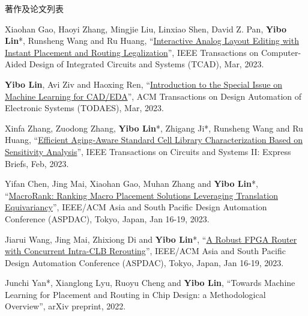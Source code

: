 \begin{rSection}{著作及论文列表}
\begin{description}[font=\normalfont, rightmargin=2em]
\item[{[J111]}]{
        Xiaohan Gao, Haoyi Zhang, Mingjie Liu, Linxiao Shen, David Z. Pan, \textbf{Yibo Lin}*, Runsheng Wang and Ru Huang, 
    ``\href{https://doi.org/10.1109/TCAD.2022.3190234}{Interactive Analog Layout Editing with Instant Placement and Routing Legalization}'', 
    IEEE Transactions on Computer-Aided Design of Integrated Circuits and Systems (TCAD), Mar, 2023.
    
}
            

\item[{[J110]}]{
        \textbf{Yibo Lin}, Avi Ziv and Haoxing Ren, 
    ``\href{https://doi.org/10.1145/3586208}{Introduction to the Special Issue on Machine Learning for CAD/EDA}'', 
    ACM Transactions on Design Automation of Electronic Systems (TODAES), Mar, 2023.
    
}
            

\item[{[J109]}]{
        Xinfa Zhang, Zuodong Zhang, \textbf{Yibo Lin}*, Zhigang Ji*, Runsheng Wang and Ru Huang, 
    ``\href{https://doi.org/10.1109/TCSII.2022.3212123}{Efficient Aging-Aware Standard Cell Library Characterization Based on Sensitivity Analysis}'', 
    IEEE Transactions on Circuits and Systems II: Express Briefs, Feb, 2023.
    
}
            

\item[{[C108]}]{
        Yifan Chen, Jing Mai, Xiaohan Gao, Muhan Zhang and \textbf{Yibo Lin}*, 
    ``\href{https://doi.org/10.1145/3566097.3567899}{MacroRank: Ranking Macro Placement Solutions Leveraging Translation Equivariancy}'', 
    IEEE/ACM Asia and South Pacific Design Automation Conference (ASPDAC), Tokyo, Japan, Jan 16-19, 2023.
    
}
            

\item[{[C107]}]{
        Jiarui Wang, Jing Mai, Zhixiong Di and \textbf{Yibo Lin}*, 
    ``\href{https://doi.org/10.1145/3566097.3567898}{A Robust FPGA Router with Concurrent Intra-CLB Rerouting}'', 
    IEEE/ACM Asia and South Pacific Design Automation Conference (ASPDAC), Tokyo, Japan, Jan 16-19, 2023.
    
}
            

\item[{[J106]}]{
        Junchi Yan*, Xianglong Lyu, Ruoyu Cheng and \textbf{Yibo Lin}, 
    ``Towards Machine Learning for Placement and Routing in Chip Design: a Methodological Overview'', 
    arXiv preprint, 2022.
    
}
\end{description}
\end{rSection}
